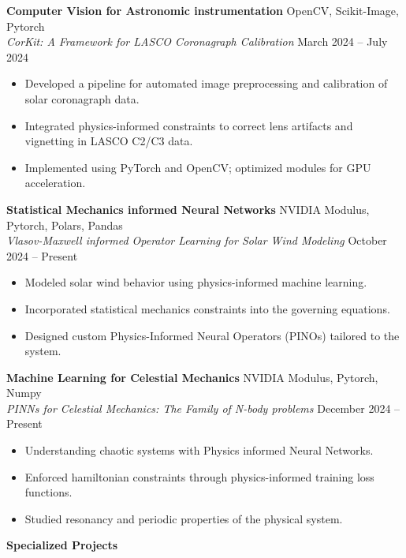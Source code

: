 \documentclass[11pt]{article}
\begin{document}
\textbf{Computer Vision for Astronomic instrumentation} \hfill OpenCV, Scikit-Image, Pytorch \\
\textit{CorKit: A Framework for LASCO Coronagraph Calibration} \hfill March 2024 – July 2024
\begin{itemize}[noitemsep]
    \item Developed a pipeline for automated image preprocessing and calibration of solar coronagraph data.
    \item Integrated physics-informed constraints to correct lens artifacts and vignetting in LASCO C2/C3 data.
    \item Implemented using PyTorch and OpenCV; optimized modules for GPU acceleration.
\end{itemize}

\textbf{Statistical Mechanics informed Neural Networks} \hfill NVIDIA Modulus, Pytorch, Polars, Pandas \\
\textit{Vlasov-Maxwell informed Operator Learning for Solar Wind Modeling} \hfill October 2024 – Present
\begin{itemize}[noitemsep]
    \item Modeled solar wind behavior using physics-informed machine learning.
    \item Incorporated statistical mechanics constraints into the governing equations.
    \item Designed custom Physics-Informed Neural Operators (PINOs) tailored to the system.\end{itemize}

\textbf{Machine Learning for Celestial Mechanics} \hfill NVIDIA Modulus, Pytorch, Numpy \\
\textit{PINNs for Celestial Mechanics: The Family of N-body problems} \hfill December 2024 – Present
\begin{itemize}[noitemsep]
    \item Understanding chaotic systems with Physics informed Neural Networks.
    \item Enforced hamiltonian constraints through physics-informed training loss functions.
    \item Studied resonancy and periodic properties of the physical system.
\end{itemize}

\begin{center}
    \textbf{Specialized Projects}
\end{center}
\end{document}
